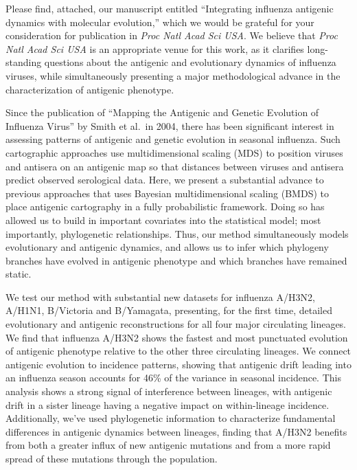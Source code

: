 \documentclass[stdletter,letterpaper,addrfromright,orderfromdateto,dateleft,11pt,noaddrto,sigleft]{newlfm}
\begin{document}
\begin{newlfm}

Please find, attached, our manuscript entitled ``Integrating influenza antigenic dynamics with molecular evolution,'' which we would be grateful for your consideration for publication in \textit{Proc Natl Acad Sci USA}.  
We believe that \textit{Proc Natl Acad Sci USA} is an appropriate venue for this work, as it clarifies long-standing questions about the antigenic and evolutionary dynamics of influenza viruses, while simultaneously presenting a major methodological advance in the characterization of antigenic phenotype.

Since the publication of ``Mapping the Antigenic and Genetic Evolution of Influenza Virus'' by Smith et al.\ in 2004, there has been significant interest in assessing patterns of antigenic and genetic evolution in seasonal influenza.
Such cartographic approaches use multidimensional scaling (MDS) to position viruses and antisera on an antigenic map so that distances between viruses and antisera predict observed serological data.
Here, we present a substantial advance to previous approaches that uses Bayesian multidimensional scaling (BMDS) to place antigenic cartography in a fully probabilistic framework.
Doing so has allowed us to build in important covariates into the statistical model; most importantly, phylogenetic relationships.
Thus, our method simultaneously models evolutionary and antigenic dynamics, and allows us to infer which phylogeny branches have evolved in antigenic phenotype and which branches have remained static.

We test our method with substantial new datasets for influenza A/H3N2, A/H1N1, B/Victoria and B/Yamagata, presenting, for the first time, detailed evolutionary and antigenic reconstructions for all four major circulating lineages.
We find that influenza A/H3N2 shows the fastest and most punctuated evolution of antigenic phenotype relative to the other three circulating lineages.
We connect antigenic evolution to incidence patterns, showing that antigenic drift leading into an influenza season accounts for 46\% of the variance in seasonal incidence.
This analysis shows a strong signal of interference between lineages, with antigenic drift in a sister lineage having a negative impact on within-lineage incidence.
Additionally, we've used phylogenetic information to characterize fundamental differences in antigenic dynamics between lineages, finding that A/H3N2 benefits from both a greater influx of new antigenic mutations and from a more rapid spread of these mutations through the population.


\end{newlfm}
\end{document}
